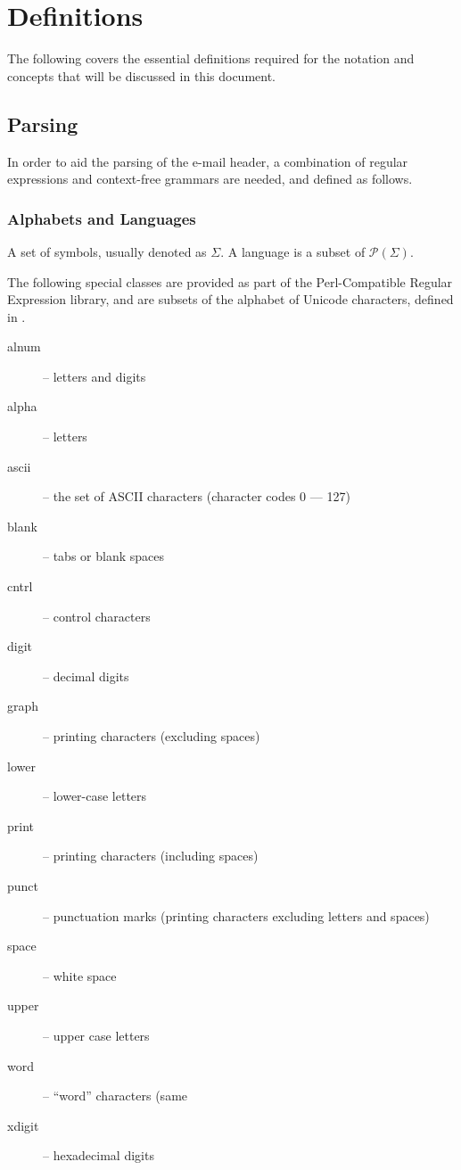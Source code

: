 \chapter{Definitions}\label{chap:def}
The following covers the essential definitions required for the notation and concepts that will be discussed in this document.
\section{Parsing}
In order to aid the parsing of the e-mail header, a combination of regular expressions and context-free grammars are needed, and defined as follows.
\subsection{Alphabets and Languages}
A set of symbols, usually denoted as $\Sigma$.  A language is a subset of $\mathcal P (\Sigma)$.

The following special classes are provided as part of the Perl-Compatible Regular Expression library, and are subsets of the alphabet of Unicode characters, defined in \cite{php_group_gutmans_lerdorf_suraski_boerger}.
\begin{description}
\item[alnum] -- letters and digits
\item[alpha] -- letters
\item[ascii] -- the set of ASCII characters (character codes 0 --- 127)
\item[blank] -- tabs or blank spaces
\item[cntrl] -- control characters
\item[digit] -- decimal digits
\item[graph] -- printing characters (excluding spaces)
\item[lower] -- lower-case letters
\item[print] -- printing characters (including spaces)
\item[punct] -- punctuation marks (printing characters excluding letters and spaces)
\item[space] -- white space
\item[upper] -- upper case letters
\item[word] -- ``word'' characters (same 
\item[xdigit] -- hexadecimal digits
\end{description}
